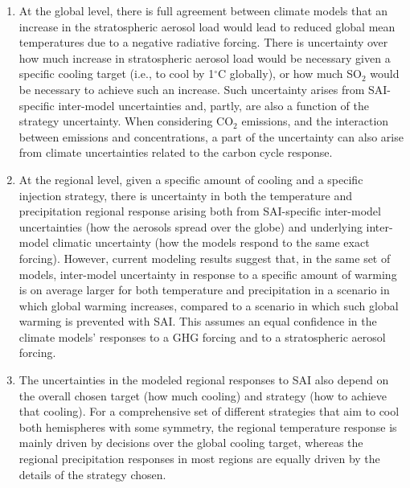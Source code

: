 \documentclass[draft]{agujournal2019}
\begin{document}
\begin{enumerate}
    \item At the global level, there is full agreement between climate models that an increase in the stratospheric aerosol load would lead to reduced global mean temperatures due to a negative radiative forcing. There is uncertainty over how much increase in stratospheric aerosol load would be necessary given a specific cooling target (i.e., to cool by 1$^{\circ}$C globally), or how much SO$_2$ would be necessary to achieve such an increase. Such uncertainty arises from SAI-specific inter-model uncertainties and, partly, are also a function of the strategy uncertainty. When considering CO$_2$ emissions, and the interaction between emissions and concentrations, a part of the uncertainty can also arise from climate uncertainties related to the carbon cycle response.
    \item At the regional level, given a specific amount of cooling and a specific injection strategy, there is uncertainty in both the temperature and precipitation regional response arising both from SAI-specific inter-model uncertainties (how the aerosols spread over the globe) and underlying inter-model climatic uncertainty (how the models respond to the same exact forcing). However, current modeling results suggest that, in the same set of models, inter-model uncertainty in response to a specific amount of warming is on average larger for both temperature and precipitation in a scenario in which global warming increases, compared to a scenario in which such global warming is prevented with SAI. This assumes an equal confidence in the climate models' responses to a GHG forcing and to a stratospheric aerosol forcing.
    \item The uncertainties in the modeled regional responses to SAI also depend on the overall chosen target (how much cooling) and strategy (how to achieve that cooling). For a comprehensive set of different strategies that aim to cool both hemispheres with some symmetry, the regional temperature response is mainly driven by decisions over the global cooling target, whereas the regional precipitation responses in most regions are equally driven by the details of the strategy chosen.
\end{enumerate}
\end{document}
